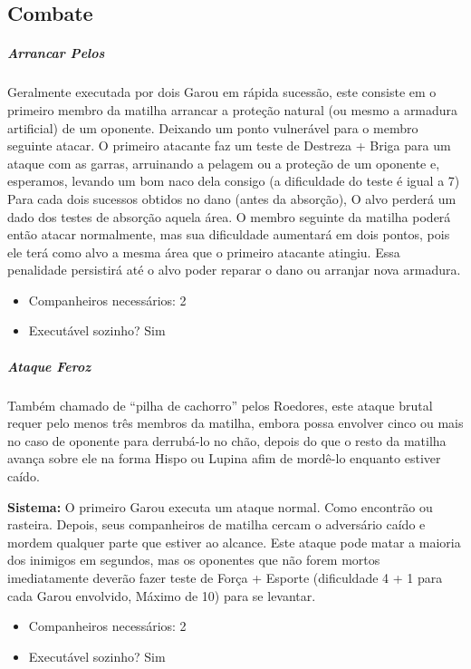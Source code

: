 
\begin{multicols}{2}
\subsection{\bf Combate}

\subparagraph{\bf Arrancar Pelos}
Geralmente executada por dois Garou em rápida sucessão, este consiste em o primeiro membro da matilha arrancar a proteção natural (ou mesmo a armadura artificial) de um oponente. Deixando um ponto vulnerável para o membro seguinte atacar. 
O primeiro atacante faz um teste de Destreza + Briga para um ataque com as garras, arruinando a pelagem ou a proteção de um oponente e, esperamos, levando um bom naco dela consigo (a dificuldade do teste é igual a 7) Para cada dois sucessos obtidos no dano (antes da absorção), O alvo perderá um dado dos testes de absorção aquela área. O membro seguinte da matilha poderá então atacar normalmente, mas sua dificuldade aumentará em dois pontos, pois ele terá como alvo a mesma área que o primeiro atacante atingiu. Essa penalidade persistirá até o alvo poder reparar o dano ou arranjar nova armadura.
\begin{itemize}[noitemsep]
\item Companheiros necessários: 2 
\item Executável sozinho? Sim
\end{itemize}

\subparagraph{\bf Ataque Feroz}
Também chamado de “pilha de cachorro” pelos Roedores, este ataque brutal requer pelo menos três membros da matilha, embora possa envolver cinco ou mais no caso de oponente para derrubá-lo no chão, depois do que o resto da matilha avança sobre ele na forma Hispo ou Lupina afim de mordê-lo enquanto estiver caído.

\textbf{Sistema:} O primeiro Garou executa um ataque normal. Como encontrão ou rasteira. Depois, seus companheiros de matilha cercam o adversário caído e mordem qualquer parte que estiver ao alcance. Este ataque pode matar a maioria dos inimigos em segundos, mas os oponentes que não forem mortos imediatamente deverão fazer teste de Força + Esporte (dificuldade 4 + 1 para cada Garou envolvido, Máximo de 10) para se levantar. 
\begin{itemize}[noitemsep]
\item Companheiros necessários: 2 
\item Executável sozinho? Sim
\end{itemize}


\end{multicols}
